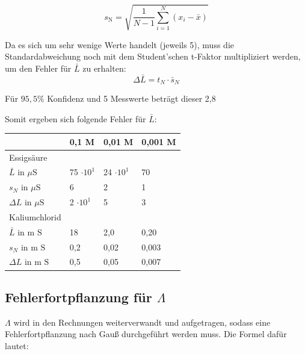 \documentclass[12pt,a4paper,titlepage,headinclude,bibtotoc]{scrartcl}
\begin{document}
\begin{equation}
s_{\mathrm{N}} = \sqrt{\frac{1}{N-1} \sum_{i=1}^{N}(x_i -\bar{x})}
\end{equation} 

Da es sich um sehr wenige Werte handelt (jeweils 5), muss die Standardabweichung noch mit dem Student'schen t-Faktor multipliziert werden, um den Fehler für $\bar{L}$ zu erhalten:\\

\begin{equation}
\Delta \bar{L} = t_N \cdot \bar{s}_N
\end{equation}

Für $95,5 \%$ Konfidenz und 5 Messwerte beträgt dieser 2,8\protect\footnotemark



Somit ergeben sich folgende Fehler für $\bar{L}$:

\begin{table} [h]
\centering 
\begin{tabular}{|p{4cm}||p{2cm}|p{2cm}|p{2cm}|}
\hline
& 0,1 M & 0,01 M & 0,001 M \\
\hline
Essigsäure & & & \\
$\bar{L}$ in $\mu \mathrm{S}$ &75 $\cdot 10^{1}$ & 24 $\cdot 10^1$ & 70\\
$s_N$ in $\mu \mathrm{S}$ & 6 & 2 & 1 \\
$\Delta L$ in $\mu \mathrm{S}$ & 2 $\cdot 10^{1}$& 5& 3\\
\hline
Kaliumchlorid & & &\\
$\bar{L}$ in m $\mathrm{S}$& 18 & 2,0 & 0,20\\
$s_N$ in m $\mathrm{S}$ & 0,2 & 0,02 & 0,003\\
$\Delta L$ in m $\mathrm{S}$ & 0,5& 0,05& 0,007\\
\hline
\end{tabular}
\end{table}

\newpage
\subsection{Fehlerfortpflanzung für $\mathit{\Lambda}$}
$\mathit{\Lambda}$ wird in den Rechnungen weiterverwandt und aufgetragen, sodass eine Fehlerfortpflanzung nach Gauß durchgeführt werden muss. Die Formel dafür lautet:\\
\end{document}
